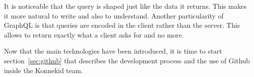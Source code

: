 It is noticeable that the query is shaped just like the data it returns. This makes it more natural to write and also to understand.
Another particularity of GraphQL is that queries are encoded in the client rather than the server. This allows to return exactly what a client asks for and no more.

Now that the main technologies have been introduced, it is time to start {\sc section}~\ref{sec:github} that describes the development process and the use of Github inside the Konnekid team.
